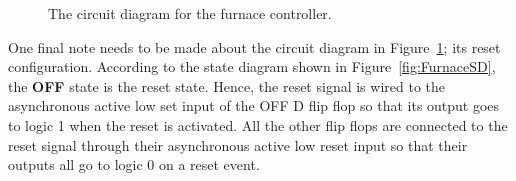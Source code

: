 \begin{figure}[ht]

\caption{The circuit diagram for the furnace controller.}
\label{fig:FurnaceCircuit}

\end{figure}

One final note needs to be made about the circuit diagram in 
Figure~\ref{fig:FurnaceCircuit}; its reset configuration.  According
to the state diagram shown in Figure~\ref{fig:FurnaceSD}, the
{\bf OFF} state is the reset state.  Hence, the reset signal
is wired to the asynchronous active low set input of the 
OFF D flip flop so that its output goes to logic 1 when the
reset is activated.  All the other flip flops are 
connected to the reset signal through their asynchronous
active low reset input so that their outputs all go to logic
0 on a reset event.

